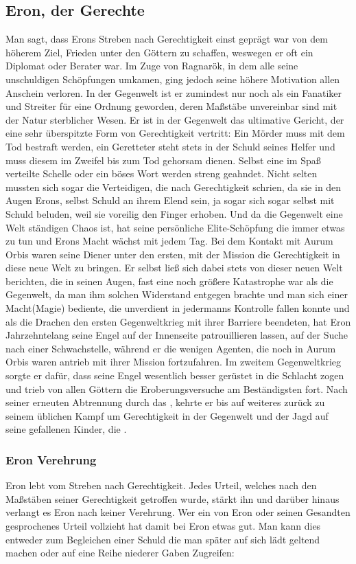 \documentclass[a4paper,12pt,oneside]{book}
\begin{document}
\subsection{Eron, der Gerechte}\label{Eron}
Man sagt, dass Erons Streben nach Gerechtigkeit einst geprägt war von dem höherem Ziel, Frieden unter den Göttern zu schaffen, weswegen er oft ein Diplomat oder Berater war. Im Zuge von Ragnarök, in dem alle seine unschuldigen Schöpfungen umkamen, ging jedoch seine höhere Motivation allen Anschein verloren. In der Gegenwelt ist er zumindest nur noch als ein Fanatiker und Streiter für eine Ordnung geworden, deren Maßstäbe unvereinbar sind mit der Natur sterblicher Wesen. Er ist in der Gegenwelt das ultimative Gericht, der eine sehr überspitzte Form von Gerechtigkeit vertritt: Ein Mörder muss mit dem Tod bestraft werden, ein Geretteter steht stets in der Schuld seines Helfer und muss diesem im Zweifel bis zum Tod gehorsam dienen. Selbst eine im Spaß verteilte Schelle oder ein böses Wort werden streng geahndet. Nicht selten mussten sich sogar die Verteidigen, die nach Gerechtigkeit schrien, da sie in den Augen Erons, selbst Schuld an ihrem Elend sein, ja sogar sich sogar selbst mit Schuld beluden, weil sie voreilig den Finger erhoben. Und da die Gegenwelt eine Welt ständigen Chaos ist, hat seine persönliche Elite-Schöpfung die \uline{} immer etwas zu tun und Erons Macht wächst mit jedem Tag. Bei dem Kontakt mit Aurum Orbis waren seine Diener unter den ersten, mit der Mission die Gerechtigkeit in diese neue Welt zu bringen. Er selbst ließ sich dabei stets von dieser neuen Welt berichten, die in seinen Augen, fast eine noch größere Katastrophe war als die Gegenwelt, da man ihm solchen Widerstand entgegen brachte und man sich einer Macht(Magie) bediente, die unverdient in jedermanns Kontrolle fallen konnte und als die Drachen den ersten Gegenweltkrieg mit ihrer Barriere beendeten, hat Eron Jahrzehntelang seine Engel auf der Innenseite patrouillieren lassen, auf der Suche nach einer Schwachstelle, während er die wenigen Agenten, die noch in Aurum Orbis waren antrieb mit ihrer Mission fortzufahren. Im zweitem Gegenweltkrieg sorgte er dafür, dass seine Engel wesentlich besser gerüstet in die Schlacht zogen und trieb von allen Göttern die Eroberungsversuche am Beständigsten fort. Nach seiner erneuten Abtrennung durch das \uline{}, kehrte er bis auf weiteres zurück zu seinem üblichen Kampf um Gerechtigkeit in der Gegenwelt und der Jagd auf seine gefallenen Kinder, die \uline{}.
\subsubsection{Eron Verehrung}
Eron lebt vom Streben nach Gerechtigkeit. Jedes Urteil, welches nach den Maßstäben seiner Gerechtigkeit getroffen wurde, stärkt ihn und darüber hinaus verlangt es Eron nach keiner Verehrung. Wer ein von Eron oder seinen Gesandten gesprochenes Urteil vollzieht hat damit bei Eron etwas gut. Man kann dies entweder zum Begleichen einer Schuld die man später auf sich lädt geltend machen oder auf eine Reihe niederer Gaben Zugreifen:
\end{document}
